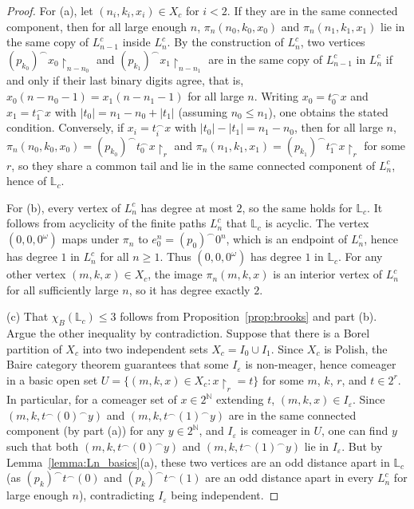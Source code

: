 \begin{proof}
    For (a), let $(n_i,k_i,x_i)\in X_c$ for $i<2$.
    If they are in the same connected component, then for all large enough $n$, $\pi_n(n_0,k_0,x_0)$ and $\pi_n(n_1,k_1,x_1)$ lie in the same copy of $L^c_{n-1}$ inside $L^c_n$.
    By the construction of $L^c_n$, two vertices $(p_{k_0})^\smallfrown x_0\restriction_{n-n_0}$ and $(p_{k_1})^\smallfrown x_1\restriction_{n-n_1}$ are in the same copy of $L^c_{n-1}$ in $L^c_n$ if and only if their last binary digits agree, that is, $x_0(n-n_0-1)=x_1(n-n_1-1)$ for all large $n$.
    Writing $x_0=t_0^\smallfrown x$ and $x_1=t_1^\smallfrown x$ with $|t_0|=n_1-n_0+|t_1|$ (assuming $n_0\leq n_1$), one obtains the stated condition.
    Conversely, if $x_i=t_i^\smallfrown x$ with $|t_0|-|t_1|=n_1-n_0$, then for all large $n$, $\pi_n(n_0,k_0,x_0)=(p_{k_0})^\smallfrown t_0^\smallfrown x\restriction_r$ and $\pi_n(n_1,k_1,x_1)=(p_{k_1})^\smallfrown t_1^\smallfrown x\restriction_r$ for some $r$, so they share a common tail and lie in the same connected component of $L^c_n$, hence of $\mathbb L_c$.

    For (b), every vertex of $L^c_n$ has degree at most $2$, so the same holds for $\mathbb L_c$.
    It follows from acyclicity of the finite paths $L^c_n$ that $\mathbb L_c$ is acyclic.
    The vertex $(0,0,0^\omega)$ maps under $\pi_n$ to $e_0^n=(p_0)^\smallfrown 0^n$, which is an endpoint of $L^c_n$, hence has degree $1$ in $L^c_n$ for all $n\geq1$.
    Thus $(0,0,0^\omega)$ has degree $1$ in $\mathbb L_c$.
    For any other vertex $(m,k,x)\in X_c$, the image $\pi_n(m,k,x)$ is an interior vertex of $L^c_n$ for all sufficiently large $n$, so it has degree exactly $2$.

    (c) That $\chi_B(\mathbb L_c)\leq3$ follows from Proposition~\ref{prop:brooks} and part (b).
    Argue the other inequality by contradiction.
    Suppose that there is a Borel partition of $X_c$ into two independent sets $X_c=I_0\cup I_1$.
    Since $X_c$ is Polish, the Baire category theorem guarantees that some $I_\varepsilon$ is non-meager, hence comeager in a basic open set $U=\{(m,k,x)\in X_c:x\restriction_r=t\}$ for some $m$, $k$, $r$, and $t\in2^r$.
    In particular, for a comeager set of $x\in2^\mathbb N$ extending $t$, $(m,k,x)\in I_\varepsilon$.
    Since $(m,k,t^\smallfrown(0)^\smallfrown y)$ and $(m,k,t^\smallfrown(1)^\smallfrown y)$ are in the same connected component (by part (a)) for any $y\in2^\mathbb N$, and $I_\varepsilon$ is comeager in $U$, one can find $y$ such that both $(m,k,t^\smallfrown(0)^\smallfrown y)$ and $(m,k,t^\smallfrown(1)^\smallfrown y)$ lie in $I_\varepsilon$.
    But by Lemma~\ref{lemma:Ln_basics}(a), these two vertices are an odd distance apart in $\mathbb L_c$ (as $(p_k)^\smallfrown t^\smallfrown(0)$ and $(p_k)^\smallfrown t^\smallfrown(1)$ are an odd distance apart in every $L^c_n$ for large enough $n$), contradicting $I_\varepsilon$ being independent.
\end{proof}

